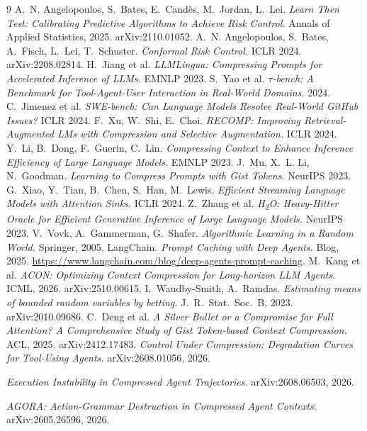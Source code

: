 \documentclass{article}
\begin{document}
\begin{thebibliography}{9}
 A.~N. Angelopoulos, S.~Bates, E.~Cand\`es, M.~Jordan, L.~Lei.
\emph{Learn Then Test: Calibrating Predictive Algorithms to Achieve Risk Control.}
Annals of Applied Statistics, 2025. arXiv:2110.01052.
 A.~N. Angelopoulos, S.~Bates, A.~Fisch, L.~Lei, T.~Schuster.
\emph{Conformal Risk Control.} ICLR 2024. arXiv:2208.02814.
 H.~Jiang et al. \emph{LLMLingua: Compressing Prompts for
Accelerated Inference of LLMs.} EMNLP 2023.
 S.~Yao et al. \emph{$\tau$-bench: A Benchmark for Tool-Agent-User
Interaction in Real-World Domains.} 2024.
 C.~Jimenez et al. \emph{SWE-bench: Can Language Models Resolve
Real-World GitHub Issues?} ICLR 2024.
 F.~Xu, W.~Shi, E.~Choi. \emph{RECOMP: Improving
Retrieval-Augmented LMs with Compression and Selective Augmentation.} ICLR 2024.
 Y.~Li, B.~Dong, F.~Guerin, C.~Lin. \emph{Compressing Context
to Enhance Inference Efficiency of Large Language Models.} EMNLP 2023.
 J.~Mu, X.~L. Li, N.~Goodman. \emph{Learning to Compress Prompts with
Gist Tokens.} NeurIPS 2023.
 G.~Xiao, Y.~Tian, B.~Chen, S.~Han, M.~Lewis. \emph{Efficient
Streaming Language Models with Attention Sinks.} ICLR 2024.
 Z.~Zhang et al. \emph{H\textsubscript{2}O: Heavy-Hitter Oracle for
Efficient Generative Inference of Large Language Models.} NeurIPS 2023.
 V.~Vovk, A.~Gammerman, G.~Shafer. \emph{Algorithmic Learning in a Random
World.} Springer, 2005.
 LangChain. \emph{Prompt Caching with Deep Agents.} Blog, 2025.
\url{https://www.langchain.com/blog/deep-agents-prompt-caching}.
 M.~Kang et al. \emph{ACON: Optimizing Context Compression for Long-horizon
LLM Agents.} ICML, 2026. arXiv:2510.00615.
 I.~Waudby-Smith, A.~Ramdas. \emph{Estimating means of bounded random variables
by betting.} J.~R.~Stat.~Soc.~B, 2023. arXiv:2010.09686.
 C.~Deng et al. \emph{A Silver Bullet or a Compromise for Full
Attention? A Comprehensive Study of Gist Token-based Context Compression.} ACL, 2025.
arXiv:2412.17483.
 \emph{Control Under Compression: Degradation Curves for
Tool-Using Agents.} arXiv:2608.01056, 2026.

 \emph{Execution Instability in Compressed Agent Trajectories.}
arXiv:2608.06503, 2026.

 \emph{AGORA: Action-Grammar Destruction in Compressed Agent Contexts.}
arXiv:2605.26596, 2026.


\end{thebibliography}
\end{document}
